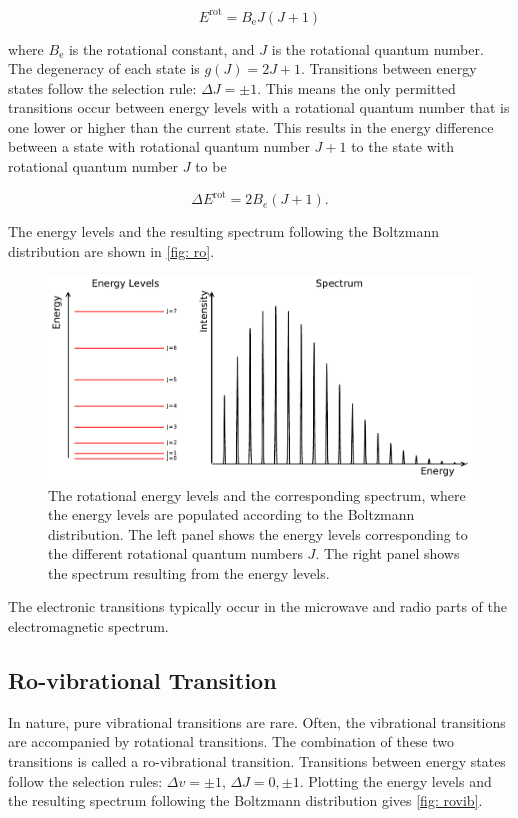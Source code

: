 \documentclass[oneside, single, authoryear, semicolon, 12pt]{lion-msc}
\newcommand{\4}{$_4$}
\newcommand{\3}{$_3$}
\newcommand{\2}{$_2$}
\begin{document}
\begin{equation}
    E^{\mathrm{rot}}=B_\mathrm{e}J(J+1)
\end{equation}

where $B_\mathrm{e}$ is the rotational constant, and $J$ is the rotational quantum number. 
The degeneracy of each state is $g(J)=2J+1$. Transitions between energy states follow the selection rule: $\Delta J=\pm 1$. This means the only permitted transitions occur between energy levels with a rotational quantum number that is one lower or higher than the current state. This results in the energy difference between a state with rotational quantum number $J+1$ to the state with rotational quantum number $J$ to be

\begin{equation}
    \Delta  E^{\mathrm{rot}}=2B_e(J+1).
\end{equation}

The energy levels and the resulting spectrum following the Boltzmann distribution are shown in \autoref{fig: ro}.

\begin{figure}[H]
    \centering
    \includegraphics[width=\linewidth]{Figures/RoSpectrum.pdf}
    \caption{The rotational energy levels and the corresponding spectrum, where the energy levels are populated according to the Boltzmann distribution. The left panel shows the energy levels corresponding to the different rotational quantum numbers $J$. The right panel shows the spectrum resulting from the energy levels.}
    \label{fig: ro}
\end{figure}

The electronic transitions typically occur in the microwave and radio parts of the electromagnetic spectrum.

\subsection{Ro-vibrational Transition}
In nature, pure vibrational transitions are rare. Often, the vibrational transitions are accompanied by rotational transitions. The combination of these two transitions is called a ro-vibrational transition. Transitions between energy states follow the selection rules: $\Delta v=\pm 1$, $\Delta J=0, \pm 1$. Plotting the energy levels and the resulting spectrum following the Boltzmann distribution gives \autoref{fig: rovib}.
\end{document}
